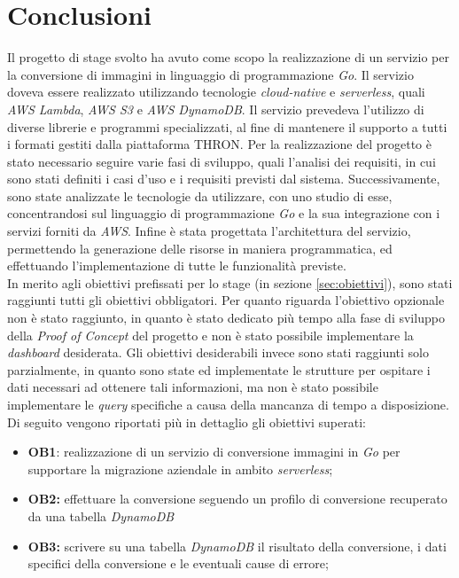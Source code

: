 \chapter{Conclusioni}
\label{cap:conclusioni}

Il progetto di stage svolto ha avuto come scopo la realizzazione di un servizio
per la conversione di immagini in linguaggio di programmazione \emph{Go}. Il
servizio doveva essere realizzato utilizzando tecnologie \emph{cloud-native} e
\emph{serverless}, quali \emph{AWS Lambda}, \emph{AWS S3} e \emph{AWS DynamoDB}.
Il servizio prevedeva l'utilizzo di diverse librerie e programmi specializzati,
al fine di mantenere il supporto a tutti i formati gestiti dalla piattaforma
THRON. Per la realizzazione del progetto è stato necessario seguire varie fasi
di sviluppo, quali l'analisi dei requisiti, in cui sono stati definiti i casi
d'uso e i requisiti previsti dal sistema. Successivamente, sono state analizzate
le tecnologie da utilizzare, con uno studio di esse, concentrandosi sul
linguaggio di programmazione \emph{Go} e la sua integrazione con i servizi
forniti da \emph{AWS}. Infine è stata progettata l'architettura del servizio,
permettendo la generazione delle risorse in maniera programmatica, ed
effettuando l'implementazione di tutte le funzionalità previste.\\

In merito agli obiettivi prefissati per lo stage (in sezione
\ref{sec:obiettivi}), sono stati raggiunti tutti gli obiettivi obbligatori. Per
quanto riguarda l'obiettivo opzionale non è stato raggiunto, in quanto è stato
dedicato più tempo alla fase di sviluppo della \emph{Proof of Concept} del
progetto e non è stato possibile implementare la \emph{dashboard} desiderata.
Gli obiettivi desiderabili invece sono stati raggiunti solo parzialmente, in
quanto sono state ed implementate le strutture per ospitare i dati necessari ad
ottenere tali informazioni, ma non è stato possibile implementare le
\emph{query} specifiche a causa della mancanza di tempo a disposizione.\\
Di seguito vengono riportati più in dettaglio gli obiettivi superati:
\begin{itemize}
      \item \textbf{OB1}: realizzazione di un servizio di conversione immagini
            in \emph{Go} per supportare la migrazione aziendale in ambito
            \emph{serverless};
      \item \textbf{OB2:} effettuare la conversione seguendo un profilo di
            conversione recuperato da una tabella \emph{DynamoDB}
      \item \textbf{OB3:} scrivere su una tabella \emph{DynamoDB} il risultato
            della conversione, i dati specifici della conversione e le eventuali cause
            di errore;
\end{itemize}

